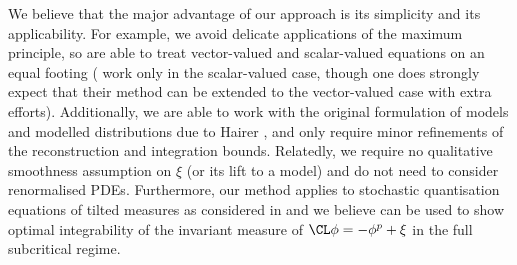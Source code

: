 \documentclass[11pt,a4paper]{article}
\numberwithin{equation}{section}
\theoremstyle{definition}
\theoremstyle{remark}
\begin{document}
We believe that the major advantage of our approach is its simplicity and its applicability.
For example, we avoid delicate applications of the maximum principle, so are able to treat vector-valued and scalar-valued equations on an equal footing (\cite{MW20_reaction,MoinatWeber20,CMW23} work only in the scalar-valued case, though one does strongly expect that their method can be extended to the vector-valued case with extra efforts).
Additionally, we are able to work with the original formulation of models and modelled distributions due to Hairer \cite{Hairer14}, and only require minor refinements of the reconstruction and integration bounds.
Relatedly, we require no qualitative smoothness assumption on $\xi$ (or its lift to a model)
and do not need to consider renormalised PDEs.
Furthermore, our method applies to stochastic quantisation equations of tilted measures as considered in \cite{Hairer_Steele_22} and we believe can be used to show optimal integrability of the invariant measure of $\CL \phi = -\phi^p +\xi$ in the full subcritical regime.

\bigskip
\end{document}
